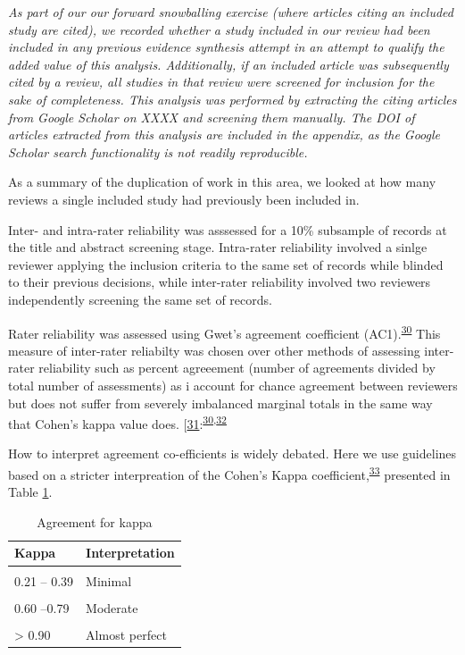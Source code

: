 \documentclass[a4paper, twoside]{templates/ociamthesis}
\begin{document}
\emph{As part of our our forward snowballing exercise (where articles citing an included study are cited), we recorded whether a study included in our review had been included in any previous evidence synthesis attempt in an attempt to qualify the added value of this analysis. Additionally, if an included article was subsequently cited by a review, all studies in that review were screened for inclusion for the sake of completeness. This analysis was performed by extracting the citing articles from Google Scholar on XXXX and screening them manually. The DOI of articles extracted from this analysis are included in the appendix, as the Google Scholar search functionality is not readily reproducible.}

As a summary of the duplication of work in this area, we looked at how many reviews a single included study had previously been included in.

Inter- and intra-rater reliability was asssessed for a 10\% subsample of records at the title and abstract screening stage. Intra-rater reliability involved a sinlge reviewer applying the inclusion criteria to the same set of records while blinded to their previous decisions, while inter-rater reliability involved two reviewers independently screening the same set of records.

Rater reliability was assessed using Gwet's agreement coefficient (AC1).\textsuperscript{\protect\hyperlink{ref-gwet2008}{30}} This measure of inter-rater reliabilty was chosen over other methods of assessing inter-rater reliability such as percent agreeement (number of agreements divided by total number of assessments) as i account for chance agreement between reviewers but does not suffer from severely imbalanced marginal totals in the same way that Cohen's kappa value does. {[}\protect\hyperlink{ref-cohen1960}{31}:\textsuperscript{\protect\hyperlink{ref-gwet2008}{30},\protect\hyperlink{ref-wongpakaran2013}{32}}

How to interpret agreement co-efficients is widely debated. Here we use guidelines based on a stricter interpreation of the Cohen's Kappa coefficient,\textsuperscript{\protect\hyperlink{ref-mchugh2012}{33}} presented in Table \ref{tab:gwet-table}.

\begin{table}[!h]

\caption{\label{tab:gwet-table}Agreement for kappa}
\centering
\begin{tabular}[t]{ll}
\toprule
Kappa & Interpretation\\
\midrule
\cellcolor{gray!6}{0 – 0.20} & \cellcolor{gray!6}{None}\\
0.21 – 0.39 & Minimal\\
\cellcolor{gray!6}{0.40 –.59} & \cellcolor{gray!6}{Weak}\\
0.60 –0.79 & Moderate\\
\cellcolor{gray!6}{0.80–0.90} & \cellcolor{gray!6}{Strong}\\
\addlinespace
> 0.90 & Almost perfect\\
\bottomrule
\end{tabular}
\end{table}
\end{document}
